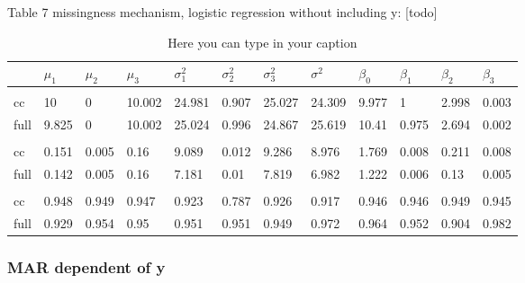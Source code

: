\documentclass[
  twocolumn]{article}
\begin{document}
Table 7 missingness mechanism, logistic regression without including y:
{[}todo{]}

\begin{table*}[bp]
\caption{Here you can type in your caption}
\begingroup\fontsize{7}{9}\selectfont

\begin{tabu} to 
\toprule
 & $\mu_1$ & $\mu_2$ & $\mu_3$ & $\sigma^2_1$ & $\sigma^2_2$ & $\sigma^2_3$ & $\sigma^2$ & $\beta_0$ & $\beta_1$ & $\beta_2$ & $\beta_3$\\
\midrule
\addlinespace[0.3em]
\\
\hspace{1em}cc & 10 & 0 & 10.002 & 24.981 & 0.907 & 25.027 & 24.309 & 9.977 & 1 & 2.998 & 0.003\\
\hspace{1em}full & 9.825 & 0 & 10.002 & 25.024 & 0.996 & 24.867 & 25.619 & 10.41 & 0.975 & 2.694 & 0.002\\
\addlinespace[0.3em]
\\
\hspace{1em}cc & 0.151 & 0.005 & 0.16 & 9.089 & 0.012 & 9.286 & 8.976 & 1.769 & 0.008 & 0.211 & 0.008\\
\hspace{1em}full & 0.142 & 0.005 & 0.16 & 7.181 & 0.01 & 7.819 & 6.982 & 1.222 & 0.006 & 0.13 & 0.005\\
\addlinespace[0.3em]
\\
\hspace{1em}cc & 0.948 & 0.949 & 0.947 & 0.923 & 0.787 & 0.926 & 0.917 & 0.946 & 0.946 & 0.949 & 0.945\\
\hspace{1em}full & 0.929 & 0.954 & 0.95 & 0.951 & 0.951 & 0.949 & 0.972 & 0.964 & 0.952 & 0.904 & 0.982\\
\bottomrule
\end{tabu}
\endgroup{}
\end{table*}

\hypertarget{mar-dependent-of-y}{%
\subsubsection{MAR dependent of y}\label{mar-dependent-of-y}}
\end{document}
